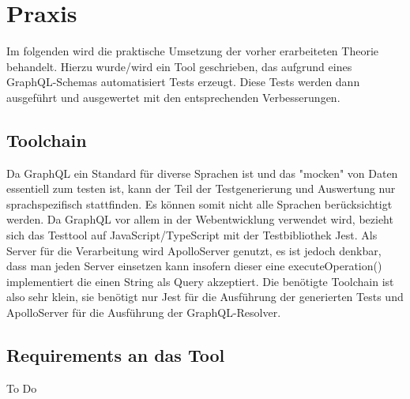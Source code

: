 \section*{Praxis}

Im folgenden wird die praktische Umsetzung der vorher erarbeiteten Theorie behandelt.
Hierzu wurde/wird ein Tool geschrieben, das aufgrund eines GraphQL-Schemas automatisiert Tests erzeugt.
Diese Tests werden dann ausgeführt und ausgewertet mit den entsprechenden Verbesserungen.

\subsection*{Toolchain}

Da GraphQL ein Standard für diverse Sprachen ist und das "mocken" von Daten essentiell zum testen ist, kann
der Teil der Testgenerierung und Auswertung nur sprachspezifisch stattfinden. Es können somit nicht alle
Sprachen berücksichtigt werden.
Da GraphQL vor allem in der Webentwicklung verwendet wird, bezieht sich das Testtool auf JavaScript/TypeScript
mit der Testbibliothek Jest.
Als Server für die Verarbeitung wird ApolloServer genutzt, es ist jedoch denkbar,
dass man jeden Server einsetzen kann insofern dieser eine executeOperation() implementiert die einen
String als Query akzeptiert.
Die benötigte Toolchain ist also sehr klein, sie benötigt nur Jest für die Ausführung der generierten Tests und
ApolloServer für die Ausführung der GraphQL-Resolver.

\subsection*{Requirements an das Tool}

To Do